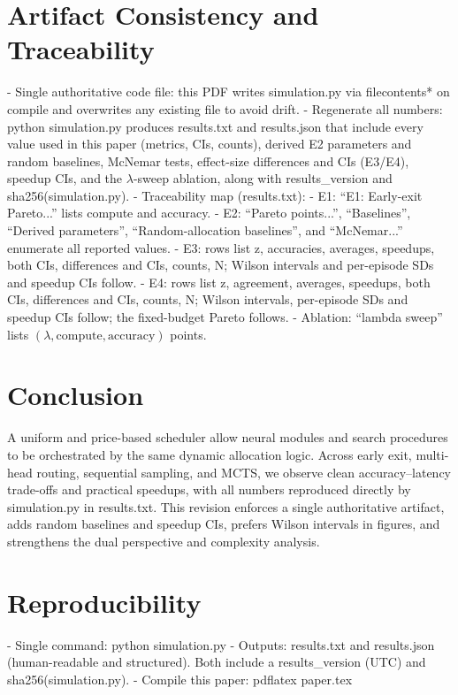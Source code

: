 \section{Artifact Consistency and Traceability}
- Single authoritative code file: this PDF writes simulation.py via filecontents* on compile and overwrites any existing file to avoid drift.
- Regenerate all numbers: python simulation.py produces results.txt and results.json that include every value used in this paper (metrics, CIs, counts), derived E2 parameters and random baselines, McNemar tests, effect-size differences and CIs (E3/E4), speedup CIs, and the $\lambda$-sweep ablation, along with results\_version and sha256(simulation.py).
- Traceability map (results.txt):
  - E1: ``E1: Early-exit Pareto...'' lists compute and accuracy.
  - E2: ``Pareto points...'', ``Baselines'', ``Derived parameters'', ``Random-allocation baselines'', and ``McNemar...'' enumerate all reported values.
  - E3: rows list z, accuracies, averages, speedups, both CIs, differences and CIs, counts, N; Wilson intervals and per-episode SDs and speedup CIs follow.
  - E4: rows list z, agreement, averages, speedups, both CIs, differences and CIs, counts, N; Wilson intervals, per-episode SDs and speedup CIs follow; the fixed-budget Pareto follows.
  - Ablation: ``lambda sweep'' lists $(\lambda,\mathrm{compute},\mathrm{accuracy})$ points.

\section{Conclusion}
A uniform \TickAPI{} and price-based scheduler allow neural modules and search procedures to be orchestrated by the same dynamic allocation logic. Across early exit, multi-head routing, sequential sampling, and MCTS, we observe clean accuracy--latency trade-offs and practical speedups, with all numbers reproduced directly by simulation.py in results.txt. This revision enforces a single authoritative artifact, adds random baselines and speedup CIs, prefers Wilson intervals in figures, and strengthens the dual perspective and complexity analysis.

\section*{Reproducibility}
- Single command: python simulation.py
- Outputs: results.txt and results.json (human-readable and structured). Both include a results\_version (UTC) and sha256(simulation.py).
- Compile this paper: pdflatex paper.tex


